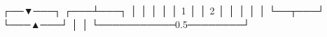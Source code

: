 \markdownRendererDocumentBegin
{}\markdownRendererInterblockSeparator
{}┌──▼───┐ ┌───┴───┐ │ │ │ │ │ 1 │ │ 2 │ │ │ │ │ └──┬───┘ └───▲───┘ │ │ └───────────0.5────────┘\markdownRendererDocumentEnd